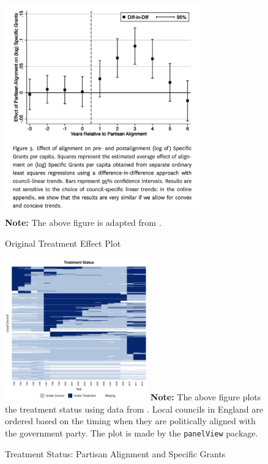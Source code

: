 \documentclass[12pt]{article}
\let\oldcenter\center
\let\oldendcenter\endcenter
\renewenvironment{center}{\setlength\topsep{0pt}\oldcenter}{\oldendcenter}
\begin{document}
\begin{figure}[!th]
\caption{Original Treatment Effect Plot}\label{fg:FM2015.original}
\centering
\begin{minipage}{1\linewidth}{
\begin{center}
\includegraphics[width = 0.75\textwidth]{ex_FM2015_fig3.png}\\
\footnotesize\textbf{Note:} The above figure is adapted from \citet{FM2015-yy}.
\end{center}
} 
\end{minipage}
\end{figure}
\clearpage

\begin{figure}[!th]
\caption{Treatment Status: Partisan Alignment and Specific Grants}\label{fg:FM2015.treat}
\centering
\begin{minipage}{1\linewidth}{
\begin{center}
\includegraphics[width = 0.55\textwidth]{ex_FM2015_treat.pdf}
\end{center}
}
\footnotesize\textbf{Note:} The above figure plots the treatment status  using data from \citet{FM2015-yy}. Local councils in England are ordered based on the timing when they are politically aligned with the government party. The plot is made by the \texttt{panelView} package.
\end{minipage}
\end{figure}
\end{document}
